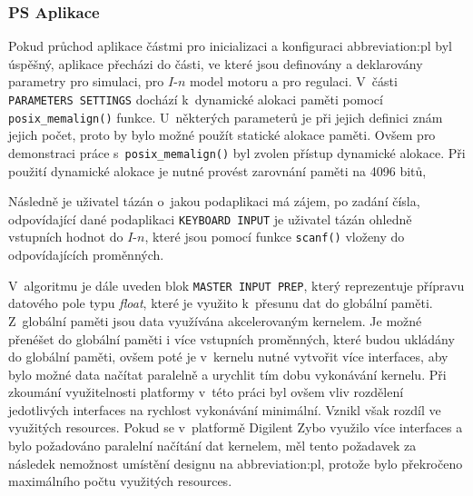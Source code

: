 \documentclass[a4paper, twoside, 11pt]{article}
\begin{document}
		\subsubsection{PS Aplikace}
			Pokud průchod aplikace částmi pro inicializaci a konfiguraci \gls{abbreviation:pl} byl úspěšný, aplikace přecházi do části, ve které jsou definovány a deklarovány parametry pro simulaci, pro $I$-$n$ model motoru a pro regulaci. V~části \texttt{PARAMETERS SETTINGS} dochází k~dynamické alokaci paměti pomocí \texttt{posix\_memalign()} funkce. U~některých parameterů je při jejich definici znám jejich počet, proto by bylo možné použít statické alokace paměti. Ovšem pro demonstraci práce s~\texttt{posix\_memalign()} byl zvolen přístup dynamické alokace. Při použití dynamické alokace je nutné provést zarovnání paměti na 4096 bitů, \par
			Následně je uživatel tázán o~jakou podaplikaci má zájem, po zadání čísla, odpovídající dané podaplikaci \texttt{KEYBOARD INPUT} je uživatel tázán ohledně vstupních hodnot do $I$-$n$, které jsou pomocí funkce \texttt{scanf()} vloženy do odpovídajících proměnných.\par
			V~algoritmu je dále uveden blok \texttt{MASTER INPUT PREP}, který reprezentuje přípravu datového pole typu \textit{float}, které je využito k~přesunu dat do globální paměti. Z~globální paměti jsou data využívána akcelerovaným kernelem. Je možné přenéšet do globální paměti i více vstupních proměnných, které budou ukládány do globální paměti, ovšem poté je v~kernelu nutné vytvořit více interfaces, aby bylo možné data načítat paralelně a urychlit tím dobu vykonávání kernelu. Při zkoumání využitelnosti platformy v~této práci byl ovšem vliv rozdělení jedotlivých interfaces na rychlost vykonávání minimální. Vznikl však rozdíl ve využitých resources. Pokud se v~platformě Digilent Zybo využilo více interfaces a bylo požadováno paralelní načítání dat kernelem, měl tento požadavek za následek nemožnost umístění designu na \gls{abbreviation:pl}, protože bylo překročeno maximálního počtu využitých resources.\par
			
\end{document}
